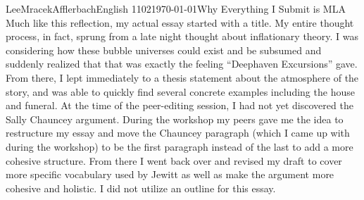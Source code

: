 \documentclass[letterpaper, 12pt]{article}
\begin{document}
\begin{mla}{Lee}{Mracek}{Afflerbach}{English 1102}{\today}{Why Everything I Submit is MLA}
  Much like this reflection, my actual essay started with a title. My entire thought process, in fact, sprung from a late night thought about inflationary theory. I was considering how these bubble universes could exist and be subsumed and suddenly realized that that was exactly the feeling ``Deephaven Excursions'' gave. From there, I lept immediately to a thesis statement about the atmosphere of the story, and was able to quickly find several concrete examples including the house and funeral. At the time of the peer-editing session, I had not yet discovered the Sally Chauncey argument. During the workshop my peers gave me the idea to restructure my essay and move the Chauncey paragraph (which I came up with during the workshop) to be the first paragraph instead of the last to add a more cohesive structure. From there I went back over and revised my draft to cover more specific vocabulary used by Jewitt as well as make the argument more cohesive and holistic. I did not utilize an outline for this essay.
\end{mla}
\end{document}
